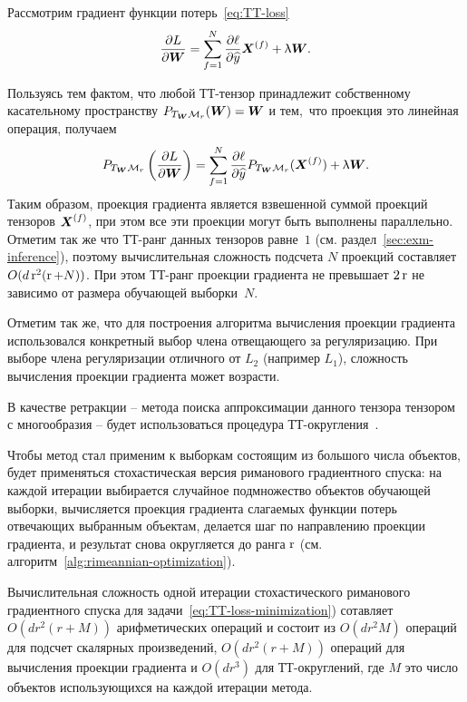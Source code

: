Рассмотрим градиент функции потерь~\eqref{eq:TT-loss}
\begin{equation}
\label{eq:TT-gradient}
\frac{\partial L}{\partial \boldsymbol{W}} = \sum_{f=1}^N \frac{\partial \ell}{\partial \widehat{y}} \boldsymbol{X}^{(f)} + \uplambda \boldsymbol{W}.
\end{equation}

Пользуясь тем фактом, что любой ТТ-тензор принадлежит собственному касательному пространству $P_{T_{\boldsymbol{W}} \mathcal{M}_r}(\boldsymbol{W}) = \boldsymbol{W}$ и тем, что проекция это линейная операция, получаем
\begin{equation}
\label{eq:riemannian-gradient}
P_{T_{\boldsymbol{W}} \mathcal{M}_r}\left ( \frac{\partial L}{\partial \boldsymbol{W}} \right) = \sum_{f=1}^N \frac{\partial \ell}{\partial \widehat{y}} P_{T_{\boldsymbol{W}} \mathcal{M}_r}(\boldsymbol{X}^{(f)}) + \uplambda \boldsymbol{W}.
\end{equation}
Таким образом, проекция градиента является взвешенной суммой проекций тензоров $\boldsymbol{X}^{(f)}$, при этом все эти проекции могут быть выполнены параллельно.
Отметим так же что ТТ-ранг данных тензоров равне~$1$ (см. раздел~\ref{sec:exm-inference}), поэтому вычислительная сложность подсчета $N$ проекций составляет $O(d \operatorname{r}^2 (\operatorname{r} + N))$.
При этом ТТ-ранг проекции градиента  не превышает $2 \operatorname{r}$ не зависимо от размера обучающей выборки~$N$.

Отметим так же, что для построения алгоритма вычисления проекции градиента использовался конкретный выбор члена отвещающего за регуляризацию. При выборе члена регуляризации отличного от  $L_2$ (например $L_1$), сложность вычисления проекции градиента может возрасти.

В качестве ретракции -- метода поиска аппроксимации данного тензора тензором с многообразия -- будет использоваться процедура ТТ-округления~\cite{oseledets2011ttMain}.

Чтобы метод стал применим к выборкам состоящим из большого числа объектов, будет применяться стохастическая версия риманового градиентного спуска: на каждой итерации выбирается случайное подмножество объектов обучающей выборки, вычисляется проекция градиента слагаемых функции потерь отвечающих выбранным объектам, делается шаг по направлению проекции градиента, и результат снова округляется до ранга $\operatorname{r}$ (см. алгоритм~\ref{alg:rimeannian-optimization}).

Вычислительная сложность одной итерации стохастического риманового градиентного спуска для задачи~\eqref{eq:TT-loss-minimization}) сотавляет $O(dr^2(r + M))$ арифметических операций и состоит из $O(dr^2M)$ операций для подсчет скалярных произведений,  $O(dr^2(r + M))$ операций для вычисления проекции градиента и $O(dr^3)$ для ТТ-округлений, где $M$ это число объектов использующихся на каждой итерации метода.



